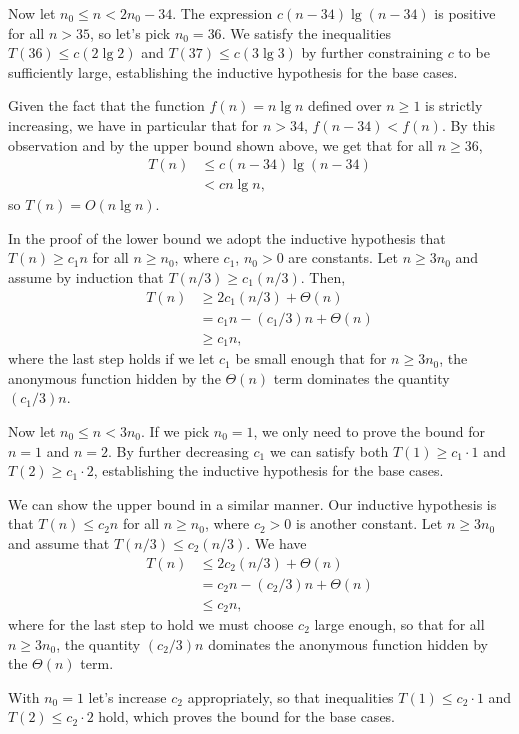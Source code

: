 Now let $n_0\le n<2n_0-34$.
The expression $c(n-34)\lg(n-34)$ is positive for all $n>35$, so let's pick $n_0=36$.
We satisfy the inequalities $T(36)\le c(2\lg2)$ and $T(37)\le c(3\lg3)$ by further constraining $c$ to be sufficiently large, establishing the inductive hypothesis for the base cases.

Given the fact that the function $f(n)=n\lg n$ defined over $n\ge1$ is strictly increasing, we have in particular that for $n>34$, $f(n-34)<f(n)$.
By this observation and by the upper bound shown above, we get that for all $n\ge36$,
\begin{align*}
    T(n) &\le c(n-34)\lg(n-34) \\
    &< cn\lg n,
\end{align*}
so $T(n)=O(n\lg n)$.

\subexercise
In the proof of the lower bound we adopt the inductive hypothesis that $T(n)\ge c_1n$ for all $n\ge n_0$, where $c_1$, $n_0>0$ are constants.
Let $n\ge3n_0$ and assume by induction that $T(n/3)\ge c_1(n/3)$.
Then,
\begin{align*}
    T(n) &\ge 2c_1(n/3)+\Theta(n) \\
    &= c_1n-(c_1/3)n+\Theta(n) \\
    &\ge c_1n,
\end{align*}
where the last step holds if we let $c_1$ be small enough that for $n\ge3n_0$, the anonymous function hidden by the $\Theta(n)$ term dominates the quantity $(c_1/3)n$.

Now let $n_0\le n<3n_0$.
If we pick $n_0=1$, we only need to prove the bound for $n=1$ and $n=2$.
By further decreasing $c_1$ we can satisfy both $T(1)\ge c_1\cdot1$ and $T(2)\ge c_1\cdot2$, establishing the inductive hypothesis for the base cases.

We can show the upper bound in a similar manner.
Our inductive hypothesis is that $T(n)\le c_2n$ for all $n\ge n_0$, where $c_2>0$ is another constant.
Let $n\ge3n_0$ and assume that $T(n/3)\le c_2(n/3)$.
We have
\begin{align*}
    T(n) &\le 2c_2(n/3)+\Theta(n) \\
    &= c_2n-(c_2/3)n+\Theta(n) \\
    &\le c_2n,
\end{align*}
where for the last step to hold we must choose $c_2$ large enough, so that for all $n\ge3n_0$, the quantity $(c_2/3)n$ dominates the anonymous function hidden by the $\Theta(n)$ term.

With $n_0=1$ let's increase $c_2$ appropriately, so that inequalities $T(1)\le c_2\cdot1$ and $T(2)\le c_2\cdot2$ hold, which proves the bound for the base cases.


